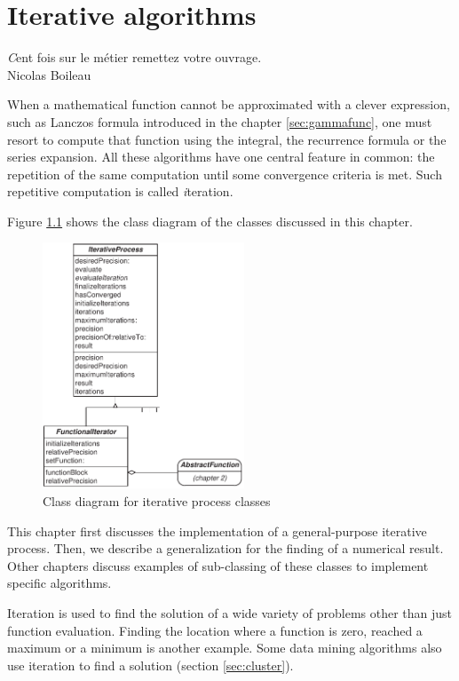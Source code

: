 %
%

\chapter{Iterative algorithms}
\label{ch:iteration} \vspace{1 ex}
\begin{flushright}
{\textsl Cent fois sur le m\'etier remettez votre ouvrage.}\\ Nicolas
Boileau
\end{flushright}
\vspace{1 ex} When a mathematical function cannot be approximated
with a clever expression, such as Lanczos formula introduced in
the chapter \ref{sec:gammafunc}, one must resort to compute that
function using the integral, the recurrence formula or the series
expansion. All these algorithms have one central feature in
common: the repetition of the same computation until some
convergence criteria is met. Such repetitive computation is called
{\textit iteration}.

Figure \ref{cl:iteration} shows the class diagram of the classes
discussed in this chapter.
\begin{figure}
\centering\includegraphics[width=6cm]{Figures/IterationClasses}
\caption{Class diagram for iterative process
classes}\label{cl:iteration}
\end{figure}
This chapter first discusses the implementation of a
general-purpose iterative process. Then, we describe a
generalization for the finding of a numerical result. Other
chapters discuss examples of sub-classing of these classes to
implement specific algorithms.

Iteration is used to find the solution of a wide variety of
problems other than just function evaluation. Finding the location
where a function is zero, reached a maximum or a minimum is
another example. Some data mining algorithms also use iteration to
find a solution (\cf section \ref{sec:cluster}).

